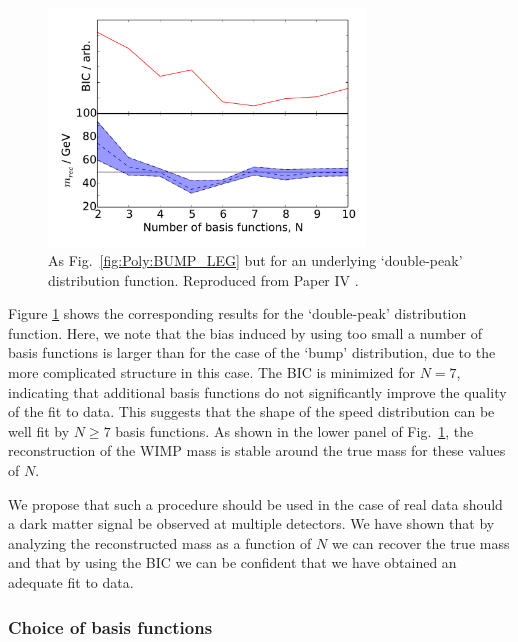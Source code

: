 \begin{figure}[t!]
\centering
  \includegraphics[width=0.75\textwidth]{Poly/VaryingN_DP_LEG.pdf}
  \caption[As Fig.~\ref{fig:Poly:BUMP_LEG} but for an underlying `double-peak' distribution function]{As Fig.~\ref{fig:Poly:BUMP_LEG} but for an underlying `double-peak' distribution function. Reproduced from Paper IV \cite{Kavanagh:2014}.}
  \label{fig:Poly:DP_LEG}
\end{figure}

Figure \ref{fig:Poly:DP_LEG} shows the corresponding results for the `double-peak' distribution function. Here, we note that the bias induced by using too small a number of basis functions is larger than for the case of the `bump' distribution, due to the more complicated structure in this case. The BIC is minimized for $N=7$, indicating that additional basis functions do not significantly improve the quality of the fit to data. This suggests that the shape of the speed distribution can be well fit by $N\geq7$ basis functions. As shown in the lower panel of Fig.~\ref{fig:Poly:DP_LEG}, the reconstruction of the WIMP mass is stable around the true mass for these values of $N$.

We propose that such a procedure should be used in the case of real data should a dark matter signal be observed at multiple detectors. We have shown that by analyzing the reconstructed mass as a function of $N$ we can recover the true mass and that by using the BIC we can be confident that we have obtained an adequate fit to data.

\subsubsection{Choice of basis functions}

